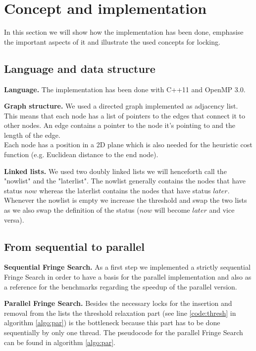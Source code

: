 \documentclass[letterpaper]{article}
\newcommand{\mypar}[1]{{\bf #1.}}
\begin{document}
\section{Concept and implementation}\label{sec:impl}

In this section we will show how the implementation has been done, emphasise the important aspects of it and illustrate the used concepts for locking.

\subsection{Language and data structure}\label{ssec:lang}

\mypar{Language}
The implementation has been done with C++11 and OpenMP 3.0.

\mypar{Graph structure}
We used a directed graph implemented as adjacency list. This means that each node has a list of pointers to the edges that connect it to other nodes. An edge contains a pointer to the node it's pointing to and the length of the edge.\\
Each node has a position in a 2D plane which is also needed for the heuristic cost function (e.g. Euclidean distance to the end node).

\mypar{Linked lists}
We used two doubly linked lists we will henceforth call the "nowlist" and the "laterlist". The nowlist generally contains the nodes that have status $now$ whereas the laterlist contains the nodes that have status $later$. Whenever the nowlist is empty we increase the threshold and swap the two lists as we also swap the definition of the status ($now$ will become $later$ and vice versa).

\subsection{From sequential to parallel}\label{ssec:seqpar}

\mypar{Sequential Fringe Search}
As a first step we implemented a strictly sequential Fringe Search in order to have a basis for the parallel implementation and also as a reference for the benchmarks regarding the speedup of the parallel version.

\mypar{Parallel Fringe Search}
Besides the necessary locks for the insertion and removal from the lists the threshold relaxation part (see line \ref{code:thresh} in algorithm \ref{algo:par}) is the bottleneck because this part has to be done sequentially by only one thread. The pseudocode for the parallel Fringe Search can be found in algorithm \ref{algo:par}.
\end{document}
